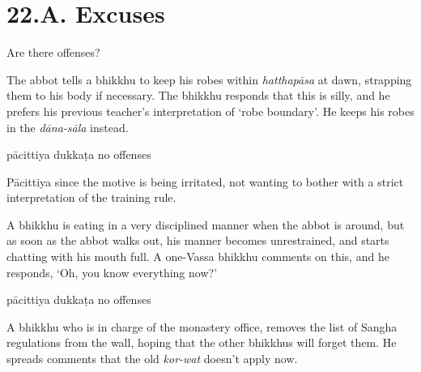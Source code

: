 \chapter{22.A. Excuses}
\renewcommand*{\theChapterTitle}{22.A. Excuses}

\begin{exam}{\autoExamName}

  \begin{problem*}

    Are there offenses?

    \begin{parts}

      \item The abbot tells a bhikkhu to keep his robes within \emph{hatthapāsa}
      at dawn, strapping them to his body if necessary. The bhikkhu responds
      that this is silly, and he prefers his previous teacher's interpretation
      of `robe boundary'. He keeps his robes in the \emph{dāna-sāla} instead.

      \bigskip

      \begin{answers}{3}
        \bChoices
         pācittiya\eAns
         dukkaṭa\eAns
         no offenses\eAns
        \eChoices
      \end{answers}

      \begin{solution}
        Pācittiya since the motive is being irritated, not wanting to bother
        with a strict interpretation of the training rule.
      \end{solution}

      \bigskip

      \item A bhikkhu is eating in a very disciplined manner when the abbot is
      around, but as soon as the abbot walks out, his manner becomes
      unrestrained, and starts chatting with his mouth full. A one-Vassa bhikkhu
      comments on this, and he responds, `Oh, you know everything now?'

      \bigskip

      \begin{answers}{3}
        \bChoices
         pācittiya\eAns
         dukkaṭa\eAns
         no offenses\eAns
        \eChoices
      \end{answers}

      \bigskip

      \item A bhikkhu who is in charge of the monastery office, removes the list
      of Sangha regulations from the wall, hoping that the other bhikkhus will
      forget them. He spreads comments that the old \emph{kor-wat} doesn't apply now.


\end{parts}
\end{problem*}
\end{exam}
